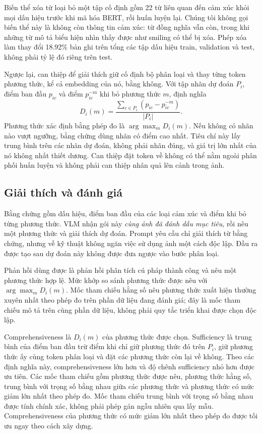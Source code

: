\documentclass[conference]{IEEEtran}
\newcommand{\ev}[2]{#2}
\begin{document}
Biến thể xóa từ loại bỏ một tập cố định gồm \ev{affect-words}{22} từ liên quan đến cảm xúc khỏi mọi dấu hiệu trước khi mã hóa BERT, rồi huấn luyện lại. Chúng tôi không gọi biến thể này là không còn thông tin cảm xúc: từ đồng nghĩa vẫn còn, trong khi những từ mô tả biểu hiện nhìn thấy được như smiling có thể bị xóa. Phép xóa làm thay đổi \ev{affect-changed}{18.92}\% bản ghi trên tổng các tập dấu hiệu train, validation và test, không phải tỷ lệ đó riêng trên test.

Ngược lại, can thiệp để giải thích giữ cố định bộ phân loại và thay từng token phương thức, kể cả embedding của nó, bằng không. Với tập nhãn dự đoán $P_i$, điểm ban đầu $p_{ic}$ và điểm $p_{ic}^{-m}$ khi bỏ phương thức $m$, định nghĩa
\begin{equation}
D_i(m)=\frac{\sum_{c\in P_i}(p_{ic}-p_{ic}^{-m})}{|P_i|}.
\end{equation}
Phương thức xác định bằng phép đo là $\arg\max_m D_i(m)$. Nếu không có nhãn nào vượt ngưỡng, bằng chứng dùng nhãn có điểm cao nhất. Tiêu chí này lấy trung bình trên các nhãn dự đoán, không phải nhãn đúng, và giá trị lớn nhất của nó không nhất thiết dương. Can thiệp đặt token về không có thể nằm ngoài phân phối huấn luyện và không phải can thiệp nhân quả lên cảnh trong ảnh.

\subsection{Giải thích và đánh giá}
Bằng chứng gồm dấu hiệu, điểm ban đầu của các loại cảm xúc và điểm khi bỏ từng phương thức. VLM nhận gói này \emph{cùng ảnh đã đánh dấu mục tiêu}, rồi nêu một phương thức và giải thích dự đoán. Prompt yêu cầu chỉ giải thích từ bằng chứng, nhưng về kỹ thuật không ngăn việc sử dụng ảnh một cách độc lập. Đầu ra được tạo sau dự đoán này không được đưa ngược vào bước phân loại.

Phản hồi dùng được là phản hồi phân tích cú pháp thành công và nêu một phương thức hợp lệ. Mức khớp so sánh phương thức được nêu với $\arg\max_m D_i(m)$. Mốc tham chiếu hằng số nêu phương thức xuất hiện thường xuyên nhất theo phép đo trên phần dữ liệu đang đánh giá; đây là mốc tham chiếu mô tả trên cùng phần dữ liệu, không phải quy tắc triển khai được chọn độc lập.

Comprehensiveness là $D_i(m)$ của phương thức được chọn. Sufficiency là trung bình của điểm ban đầu trừ điểm khi chỉ giữ phương thức đó trên $P_i$, giữ phương thức ấy cùng token phân loại và đặt các phương thức còn lại về không. Theo các định nghĩa này, comprehensiveness lớn hơn và độ chênh sufficiency nhỏ hơn được ưu tiên. Các mốc tham chiếu gồm phương thức được nêu, phương thức hằng số, trung bình với trọng số bằng nhau giữa các phương thức và phương thức có mức giảm lớn nhất theo phép đo. Mốc tham chiếu trung bình với trọng số bằng nhau được tính chính xác, không phải phép gán ngẫu nhiên qua lấy mẫu. Comprehensiveness của phương thức có mức giảm lớn nhất theo phép đo được tối ưu ngay theo cách xây dựng.
\end{document}
